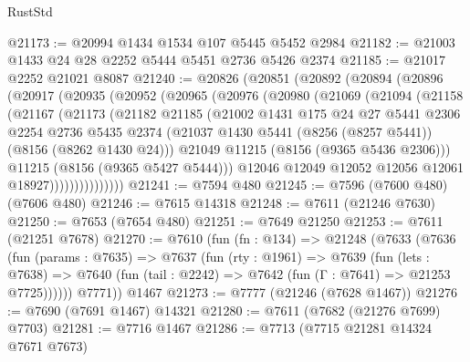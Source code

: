 \begin{lexlean}{RustStd}
\begin{coremodule}
{\begin{coremodule}
{{{{{{{{{{{{{{{{{{{{{{{{{{{{{{{{{{@21173 := @20994 @1434 @1534 @107 @5445 @5452 @2984
@21182 := @21003 @1433 @24 @28 @2252 @5444 @5451 @2736 @5426 @2374
@21185 := @21017 @2252 @21021 @8087
@21240 := @20826
    (@20851
      (@20892
        (@20894
          (@20896
            (@20917
              (@20935
                (@20952
                  (@20965
                    (@20976
                      (@20980
                        (@21069
                          (@21094
                            (@21158
                              (@21167
                                (@21173
                                  (@21182
                                    @21185
                                    (@21002
                                      @1431
                                      @175
                                      @24
                                      @27
                                      @5441
                                      @2306
                                      @2254
                                      @2736
                                      @5435
                                      @2374
                                      (@21037
                                        @1430
                                        @5441
                                        (@8256 (@8257 @5441))
                                        (@8156 (@8262 @1430 @24)))
                                      @21049
                                      @11215
                                      (@8156 (@9365 @5436 @2306)))
                                    @11215
                                    (@8156 (@9365 @5427 @5444)))
                                  @12046
                                  @12049
                                  @12052
                                  @12056
                                  @12061
                                  @18927)))))))))))))))
@21241 := @7594 @480
@21245 := @7596 (@7600 @480) (@7606 @480)
@21246 := @7615 @14318
@21248 := @7611 (@21246 @7630)
@21250 := @7653 (@7654 @480)
@21251 := @7649 @21250
@21253 := @7611 (@21251 @7678)
@21270 := @7610
    (fun (fn : @134) =>
    @21248
      (@7633
        (@7636
          (fun (params : @7635) =>
          @7637
            (fun (rty : @1961) =>
            @7639
              (fun (lets : @7638) =>
              @7640 (fun (tail : @2242) => @7642 (fun (Γ : @7641) => @21253 @7725))))))
        @7771))
    @1467
@21273 := @7777 (@21246 (@7628 @1467))
@21276 := @7690 (@7691 @1467) @14321
@21280 := @7611 (@7682 (@21276 @7699) @7703)
@21281 := @7716 @1467
@21286 := @7713 (@7715 @21281 @14324 @7671 @7673)
}}}}}}}}}}}}}}}}}}}}}}}}}}}}}}}}}}
\end{coremodule}}
\end{coremodule}
\end{lexlean}
